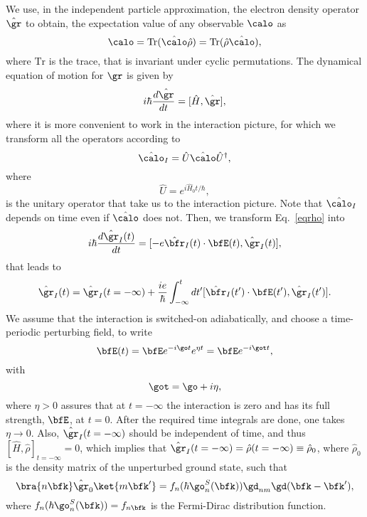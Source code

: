 \documentclass[floatfix,prb,aps,superscriptaddress,11pt,preprint,letterpaper]{revtex4}
\begin{document}
We use, in the independent particle approximation, the electron density
operator $\hat\gr$ to obtain, the expectation value of any observable
$\calo$ as
\begin{equation}\label{traza}
  \calo=\mathrm{Tr}(\hat\calo\hat\rho)=\mathrm{Tr}(\hat\rho\hat\calo),
\end{equation}
where $\mathrm{Tr}$ is the trace, that is
invariant under cyclic permutations.
The dynamical equation of motion for $\gr$ is given by
\begin{equation}\label{eqrho}
i\hbar \frac{d\hat\gr}{dt}=[\hat{H},\hat\gr]
,
\end{equation}
where it is more convenient to work in the interaction picture, for
which we transform all the operators according to 
\begin{equation}\label{ip}
\hat{\calo}_I=\hat{U}\hat{\calo}\hat{U}^\dagger,
\end{equation}
where
\begin{equation}\label{ou}
\hat{U}=e^{i\hat{H}_0t/\hbar},
\end{equation}
is the unitary operator that take us to the interaction picture.
Note that $\hat\calo_I$ depends on time even if $\hat\calo$ does not.
Then, we transform Eq.~\eqref{eqrho} into
\begin{equation}\label{intrho}
i\hbar\frac{d\hat\gr_I(t)}{dt}=[-e\hat\bfr_I(t)\cdot\bfE(t),\hat\gr_I(t)],
\end{equation}
that leads to
\begin{equation}\label{intrho2}
\hat\gr_I(t)=\hat\gr_I(t=-\infty)
+
\frac{ie}{\hbar}\int_{-\infty}^t dt'[\hat\bfr_I(t')\cdot\bfE(t'),\hat\gr_I(t')].
\end{equation}
We assume that the interaction is switched-on adiabatically, and
choose a time-periodic perturbing field, to write
\begin{equation}\label{efield}
\bfE(t)=\bfE e^{-i\go t}e^{\eta t}=\bfE e^{-i\got t}
,
\end{equation}
with
\begin{equation}\label{got}
\got=\go+i\eta
,
\end{equation} 
where $\eta > 0$ assures
that at $t=-\infty$ the interaction is zero and has its full strength, $\bfE$,
at $t=0$. After the required time integrals are done, one takes
$\eta\to 0$. 
Also, $\hat\gr_I(t=-\infty)$ should be independent of time, and thus 
$[\hat{H},\hat\rho]_{t=-\infty}=0$, which implies that 
$\hat\gr_I(t=-\infty)=\hat\rho(t=-\infty)\equiv\hat\rho_0$,
where $\hat\rho_0$ is
the density matrix of the unperturbed ground state,
such that
\begin{equation}\label{nrhon}
\bra{n\bfk}\hat\gr_0\ket{m\bfk'}=f_n(\hbar\go^S_n(\bfk))\gd_{nm}\gd(\bfk-\bfk')
,
\end{equation}
where $f_n(\hbar\go^S_n(\bfk))=f_{n\bfk}$ is the Fermi-Dirac distribution function.
\end{document}

